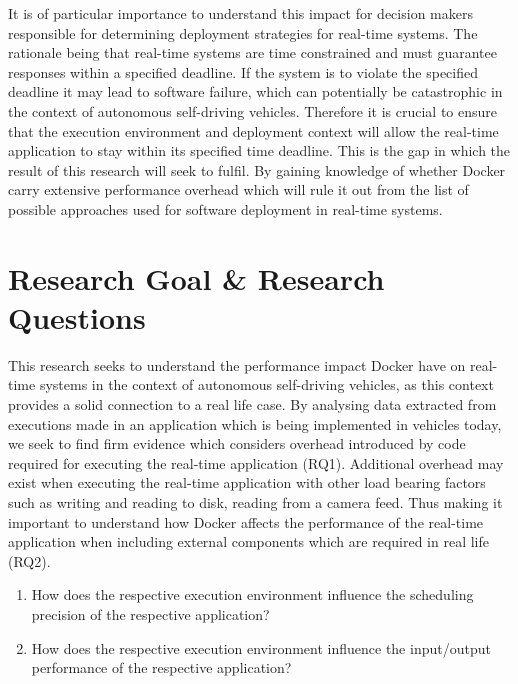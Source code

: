 It is of particular importance to understand this impact for decision makers responsible for determining deployment strategies for real-time systems. The rationale being that real-time systems are time constrained and must guarantee responses within a specified deadline. If the system is to violate the specified deadline it may lead to software failure, which can potentially be catastrophic in the context of autonomous self-driving vehicles. Therefore it is crucial to ensure that the execution environment and deployment context will allow the real-time application to stay within its specified time deadline. This is the gap in which the result of this research will seek to fulfil. By gaining knowledge of whether Docker carry extensive performance overhead which will rule it out from the list of possible approaches used for software deployment in real-time systems.\\

\section{Research Goal \& Research Questions}
This research seeks to understand the performance impact Docker have on real-time systems in the context of autonomous self-driving vehicles, as this context provides a solid connection to a real life case. By analysing data extracted from executions made in an application which is being implemented in vehicles today, we seek to find firm evidence which considers overhead introduced by code required for executing the real-time application (RQ1). Additional overhead may exist when executing the real-time application with other load bearing factors such as writing and reading to disk, reading from a camera feed. Thus making it important to understand how Docker affects the performance of the real-time application when including external components which are required in real life (RQ2).\\

\begin{enumerate}[label=\textbf{RQ\arabic*}]
	\item How does the respective execution environment influence the scheduling precision of the respective application?
	\item How does the respective execution environment influence the input/output performance of the respective application?\\
\end{enumerate}





